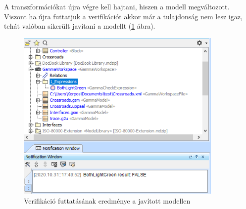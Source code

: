 A transzformációkat újra végre kell hajtani, hiszen a modell megváltozott. Viszont ha újra futtatjuk a verifikációt akkor már a tulajdonság nem lesz igaz, tehát valóban sikerült javítani a modellt (\ref{fig:verif2} ábra).

\begin{figure}[!ht]
	\centering
	\includegraphics[width=10cm, keepaspectratio]{figures/contribution/verif2.png}
	\caption{Verifikáció futtatásának eredménye a javított modellen}
	\label{fig:verif2}
\end{figure}




